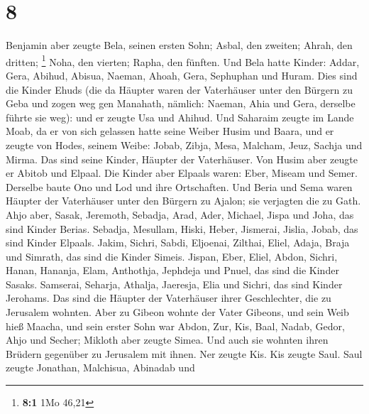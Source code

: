 \hypertarget{section-7}{%
\section{8}\label{section-7}}

 Benjamin aber zeugte Bela, seinen ersten Sohn; Asbal, den
zweiten; Ahrah, den dritten; \footnote{\textbf{8:1} 1Mo 46,21}
 Noha, den vierten; Rapha, den fünften.  Und
Bela hatte Kinder: Addar, Gera, Abihud,  Abisua, Naeman,
Ahoah,  Gera, Sephuphan und Huram.  Dies
sind die Kinder Ehuds (die da Häupter waren der Vaterhäuser unter den
Bürgern zu Geba und zogen weg gen Manahath,  nämlich:
Naeman, Ahia und Gera, derselbe führte sie weg): und er zeugte Usa und
Ahihud.  Und Saharaim zeugte im Lande Moab, da er von sich
gelassen hatte seine Weiber Husim und Baara,  und er
zeugte von Hodes, seinem Weibe: Jobab, Zibja, Mesa, Malcham,
 Jeuz, Sachja und Mirma. Das sind seine Kinder, Häupter
der Vaterhäuser.  Von Husim aber zeugte er Abitob und
Elpaal.  Die Kinder aber Elpaals waren: Eber, Miseam und
Semer. Derselbe baute Ono und Lod und ihre Ortschaften. 
Und Beria und Sema waren Häupter der Vaterhäuser unter den Bürgern zu
Ajalon; sie verjagten die zu Gath.  Ahjo aber, Sasak,
Jeremoth,  Sebadja, Arad, Ader,  Michael,
Jispa und Joha, das sind Kinder Berias.  Sebadja,
Mesullam, Hiski, Heber,  Jismerai, Jislia, Jobab, das
sind Kinder Elpaals.  Jakim, Sichri, Sabdi,
 Eljoenai, Zilthai, Eliel,  Adaja, Braja
und Simrath, das sind die Kinder Simeis.  Jispan, Eber,
Eliel,  Abdon, Sichri, Hanan,  Hananja,
Elam, Anthothja,  Jephdeja und Pnuel, das sind die Kinder
Sasaks.  Samserai, Seharja, Athalja, 
Jaeresja, Elia und Sichri, das sind Kinder Jerohams.  Das
sind die Häupter der Vaterhäuser ihrer Geschlechter, die zu Jerusalem
wohnten.  Aber zu Gibeon wohnte der Vater Gibeons, und
sein Weib hieß Maacha,  und sein erster Sohn war Abdon,
Zur, Kis, Baal, Nadab,  Gedor, Ahjo und Secher;
 Mikloth aber zeugte Simea. Und auch sie wohnten ihren
Brüdern gegenüber zu Jerusalem mit ihnen.  Ner zeugte
Kis. Kis zeugte Saul. Saul zeugte Jonathan, Malchisua, Abinadab und
